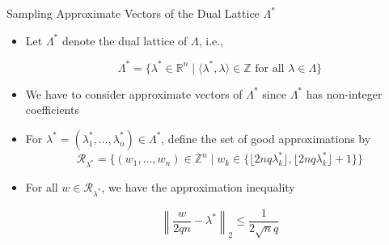 \documentclass{beamer}
\newcommand{\R}{\mathbb{R}}
\newcommand{\Z}{\mathbb{Z}}
\renewcommand{\>}{\rangle}
\newcommand{\<}{\langle}
\begin{document}
\begin{frame}{Sampling Approximate Vectors of the Dual Lattice $\Lambda^*$}

\begin{itemize}
\item Let $\Lambda^*$ denote the dual lattice of $\Lambda$, i.e.,

\[
\Lambda^* = \{ \lambda^*\in\R^n \mid \<\lambda^*,\lambda\>\in\Z \mbox{ for all } \lambda\in\Lambda \}
\]

\medskip
\item
We have to consider approximate vectors of $\Lambda^*$ since $\Lambda^*$ has non-integer coefficients

\medskip
\item For $\lambda^*=(\lambda^*_1,\ldots,\lambda^*_n)\in\Lambda^*$, define the set of good approximations by
\[
\mathcal{R}_{\lambda^*} = \big\{
(w_1,\ldots,w_n) \in\Z^n \mid w_k \in \{ \lfloor 2nq \lambda_k^* \rfloor, \lfloor 2nq \lambda_k^* \rfloor + 1 \} 
\big\}
\]

\medskip
\item For all $w\in\mathcal{R}_{\lambda^*}$, we have the approximation inequality

\[
\left\| \frac{w}{2 q n} - \lambda^* \right\|_2 \le \frac{1}{2\sqrt{n}q}
\]


\end{itemize}
\end{frame}

\end{document}

